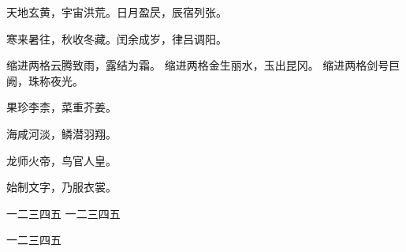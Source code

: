 \documentclass{ltc-cn-vbook}
\begin{document}
\newpage

\begin{正文}

天地玄黄，宇宙洪荒。日月盈昃，辰宿列张。

\begin{段落}[indent=2]
寒来暑往，秋收冬藏。闰余成岁，律吕调阳。
\end{段落}

\begin{段落}[indent=2]
缩进两格 云腾致雨，露结为霜。
缩进两格 金生丽水，玉出昆冈。
缩进两格 剑号巨阙，珠称夜光。
\end{段落}

果珍李柰， 菜重芥姜。

海咸河淡， 鳞潜羽翔。

龙师火帝，鸟官人皇。

始制 文字，乃服衣裳。

\end{正文}

\newpage

\begin{正文}



一二三四五
一二三四五

一二三四五






\end{正文}
\end{document}

